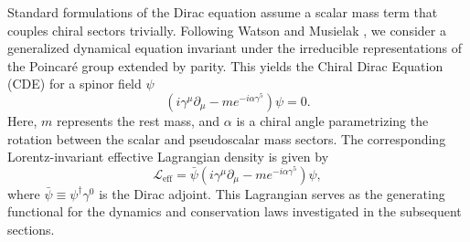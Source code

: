 Standard formulations of the Dirac equation assume a scalar mass term that
couples chiral sectors trivially. Following Watson and Musielak
\cite{watsonChiralSymmetryDirac2020}, we consider a generalized dynamical
equation invariant under the irreducible representations of the Poincar\'{e}
group extended by parity. This yields the Chiral Dirac Equation (CDE) for a
spinor field $\psi$
\begin{equation}
	(i \gamma^\mu \partial_\mu - m e^{- i \alpha \gamma^5}) \psi = 0.
	\label{eq:CDE}
\end{equation}
Here, $m$ represents the rest mass, and $\alpha$ is a chiral angle parametrizing
the rotation between the scalar and pseudoscalar mass sectors. The corresponding
Lorentz-invariant effective Lagrangian density is given by
\begin{equation}
	\mathcal{L}_{\text{eff}} = \bar{\psi} (i \gamma^\mu \partial_\mu - m
	e^{- i \alpha \gamma^5}) \psi,
	\label{eq:Lagrangian}
\end{equation}
where $\bar{\psi} \equiv \psi^\dagger \gamma^0$ is the Dirac adjoint. This
Lagrangian serves as the generating functional for the dynamics and
conservation laws investigated in the subsequent sections.
